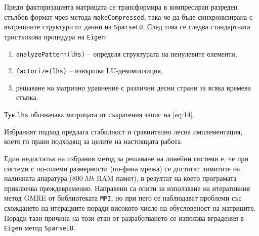 \documentclass{report}
\begin{document}
	Преди факторизацията матрицата се трансформира в компресиран разреден стълбов формат чрез метода \texttt{makeCompressed}, така че да бъде синхронизирана с вътрешните структури от данни на \texttt{SparseLU}. След това се следва стандартната тристъпкова процедура на \texttt{Eigen}:
	\begin{enumerate}
		\item \texttt{analyzePattern(lhs)} – определя структурата на ненулевите елементи,
		\item \texttt{factorize(lhs)} – извършва LU-декомпозиция,
		\item решаване на матрично уравнение с различни десни страни за всяка времева стъпка.
	\end{enumerate}
	
	Тук \texttt{lhs} обозначава матрицата от съкратения запис на \eqref{eq:14}.
	
	Избраният подход предлага стабилност и сравнително лесна имплементация, което го прави подходящ за целите на настоящата работа.
	
	Един недостатък на избрания метод за решаване на линейни системи е, че при системи с по-големи размерности (по-фина мрежа) се достигат лимитите на наличната апаратура ($800~Mb$ RAM памет), в резултат на което програмата приключва преждевременно. Направени са опити за използване на итеративния метод GMRE \cite{gmre_1986} от библиотеката \texttt{MPI}, но при него се наблюдават проблеми със схождането на итерациите поради високото число на обусловеност на матриците. Поради тази причина на този етап от разработването се използва вградения в \texttt{Eigen} метод \texttt{SparseLU}.
	
	
\end{document}
